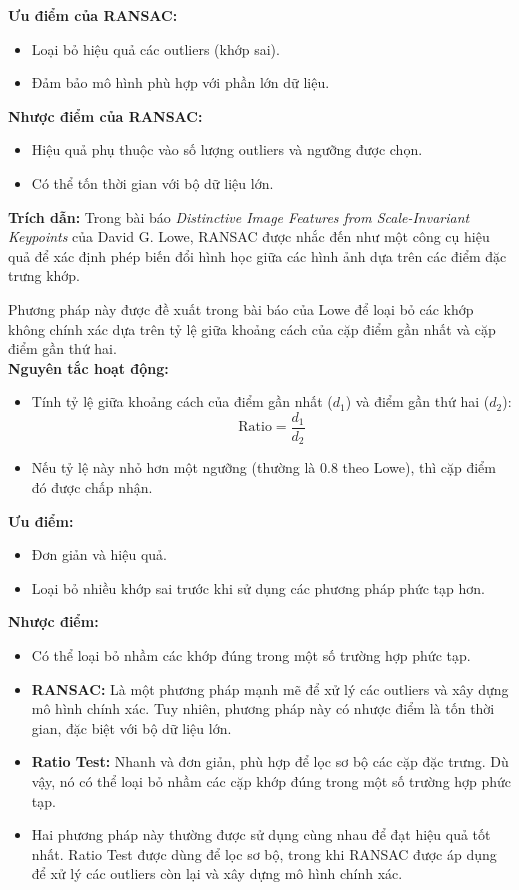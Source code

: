 \textbf{Ưu điểm của RANSAC:}
\begin{itemize}
	\item Loại bỏ hiệu quả các outliers (khớp sai).
	\item Đảm bảo mô hình phù hợp với phần lớn dữ liệu.
\end{itemize}

\textbf{Nhược điểm của RANSAC:}
\begin{itemize}
	\item Hiệu quả phụ thuộc vào số lượng outliers và ngưỡng được chọn.
	\item Có thể tốn thời gian với bộ dữ liệu lớn.
\end{itemize}

\textbf{Trích dẫn:} Trong bài báo \textit{Distinctive Image Features from Scale-Invariant Keypoints} của David G. Lowe\cite{D.Lowe}, RANSAC được nhắc đến như một công cụ hiệu quả để xác định phép biến đổi hình học giữa các hình ảnh dựa trên các điểm đặc trưng khớp.

Phương pháp này được đề xuất trong bài báo của Lowe để loại bỏ các khớp không chính xác dựa trên tỷ lệ giữa khoảng cách của cặp điểm gần nhất và cặp điểm gần thứ hai.\\

\textbf{Nguyên tắc hoạt động:}
\begin{itemize}
	\item Tính tỷ lệ giữa khoảng cách của điểm gần nhất (\(d_1\)) và điểm gần thứ hai (\(d_2\)):
	\[
	\text{Ratio} = \frac{d_1}{d_2}
	\]
	\item Nếu tỷ lệ này nhỏ hơn một ngưỡng (thường là 0.8 theo Lowe), thì cặp điểm đó được chấp nhận.
\end{itemize}

\textbf{Ưu điểm:}
\begin{itemize}
	\item Đơn giản và hiệu quả.
	\item Loại bỏ nhiều khớp sai trước khi sử dụng các phương pháp phức tạp hơn.
\end{itemize}

\textbf{Nhược điểm:}
\begin{itemize}
	\item Có thể loại bỏ nhầm các khớp đúng trong một số trường hợp phức tạp.
\end{itemize}


\begin{itemize}
	\item \textbf{RANSAC:} Là một phương pháp mạnh mẽ để xử lý các outliers và xây dựng mô hình chính xác. Tuy nhiên, phương pháp này có nhược điểm là tốn thời gian, đặc biệt với bộ dữ liệu lớn.
	\item \textbf{Ratio Test:} Nhanh và đơn giản, phù hợp để lọc sơ bộ các cặp đặc trưng. Dù vậy, nó có thể loại bỏ nhầm các cặp khớp đúng trong một số trường hợp phức tạp.
	\item Hai phương pháp này thường được sử dụng cùng nhau để đạt hiệu quả tốt nhất. Ratio Test được dùng để lọc sơ bộ, trong khi RANSAC được áp dụng để xử lý các outliers còn lại và xây dựng mô hình chính xác.
\end{itemize}
